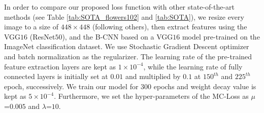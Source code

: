 \documentclass[journal]{IEEEtran}
\begin{document}
In order to compare our proposed loss function with other state-of-the-art methods (see Table \ref{tab:SOTA_flowers102} and \ref{tab:SOTA}), we resize every image to a size of $448\times448$ (following others), then extract features using the VGG$16$ (ResNet$50$), and the B-CNN \cite{lin2015bilinear} based on a VGG$16$ model pre-trained on the ImageNet classification dataset. We use Stochastic Gradient Descent optimizer and batch normalization as the regularizer. The learning rate of the pre-trained feature extraction layers are kept as $1\times10^{-4}$, while the learning rate of fully connected layers is initially set at $0.01$ and multiplied by $0.1$ at $150^{th}$ and $225^{th}$ epoch, successively. We train our model for $300$ epochs and weight decay value is kept as  $5\times10^{-4}$. Furthermore, we set the hyper-parameters of the MC-Loss as $\mu$ =$0.005$ and $\lambda$=$10$.
\end{document}

